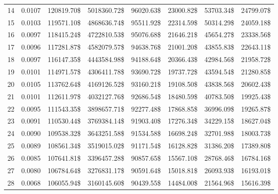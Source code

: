 \begin{tabular}{lrrrrrrr}
14 & \num{0.0107} & \num{120819.70}\$ & \num{5018360.72}\$ &  \num{96020.63}\$ & \num{23000.82}\$ & \num{53703.34}\$ & \num{24799.07}\$ \\
15 & \num{0.0103} & \num{119571.10}\$ & \num{4868636.74}\$ &  \num{95511.92}\$ & \num{22314.59}\$ & \num{50314.29}\$ & \num{24059.18}\$ \\
16 & \num{0.0097} & \num{118415.24}\$ & \num{4722810.53}\$ &  \num{95076.68}\$ & \num{21646.21}\$ & \num{45654.27}\$ & \num{23338.56}\$ \\
17 & \num{0.0096} & \num{117281.87}\$ & \num{4582079.57}\$ &  \num{94638.76}\$ & \num{21001.20}\$ & \num{43855.83}\$ & \num{22643.11}\$ \\
18 & \num{0.0097} & \num{116147.35}\$ & \num{4443584.98}\$ &  \num{94188.64}\$ & \num{20366.43}\$ & \num{42984.56}\$ & \num{21958.72}\$ \\
19 & \num{0.0101} & \num{114971.57}\$ & \num{4306411.78}\$ &  \num{93690.72}\$ & \num{19737.72}\$ & \num{43594.54}\$ & \num{21280.85}\$ \\
20 & \num{0.0105} & \num{113762.64}\$ & \num{4169126.52}\$ &  \num{93160.21}\$ & \num{19108.50}\$ & \num{43838.56}\$ & \num{20602.43}\$ \\
21 & \num{0.0101} & \num{112611.97}\$ & \num{4032127.76}\$ &  \num{92686.54}\$ & \num{18480.59}\$ & \num{40783.50}\$ & \num{19925.43}\$ \\
22 & \num{0.0095} & \num{111543.35}\$ & \num{3898657.71}\$ &  \num{92277.48}\$ & \num{17868.85}\$ & \num{36996.09}\$ & \num{19265.87}\$ \\
23 & \num{0.0091} & \num{110530.44}\$ & \num{3769384.14}\$ &  \num{91903.40}\$ & \num{17276.34}\$ & \num{34229.15}\$ & \num{18627.04}\$ \\
24 & \num{0.0090} & \num{109538.32}\$ & \num{3643251.58}\$ &  \num{91534.58}\$ & \num{16698.24}\$ & \num{32701.98}\$ & \num{18003.73}\$ \\
25 & \num{0.0089} & \num{108561.34}\$ & \num{3519015.02}\$ &  \num{91171.54}\$ & \num{16128.82}\$ & \num{31386.20}\$ & \num{17389.80}\$ \\
26 & \num{0.0085} & \num{107641.81}\$ & \num{3396457.28}\$ &  \num{90857.65}\$ & \num{15567.10}\$ & \num{28768.46}\$ & \num{16784.16}\$ \\
27 & \num{0.0080} & \num{106784.64}\$ & \num{3276831.17}\$ &  \num{90591.64}\$ & \num{15018.81}\$ & \num{26093.93}\$ & \num{16193.01}\$ \\
28 & \num{0.0068} & \num{106055.94}\$ & \num{3160145.60}\$ &  \num{90439.55}\$ & \num{14484.00}\$ & \num{21564.96}\$ & \num{15616.39}\$ \\

\end{tabular}
